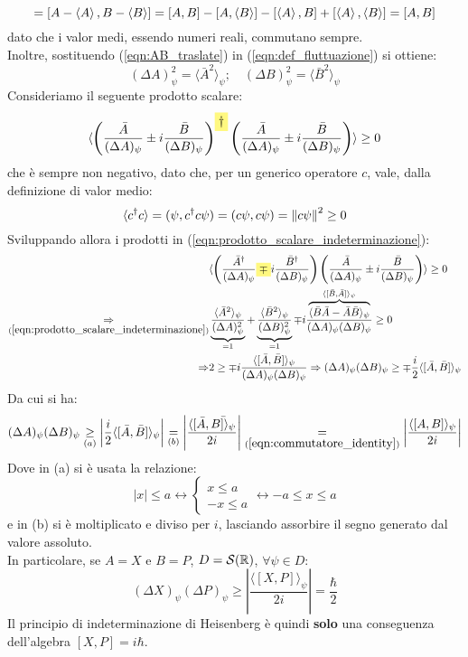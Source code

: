 \documentclass[../../FisicaTeorica.tex]{subfiles}
\begin{document}
\begin{equation}
[\bar{A},\bar{B}]=[A-\avg{A},B-\avg{B}]=[A,B]-[A,\avg{B}]-[\avg{A},B]+[\avg{A},\avg{B}]=[A,B]
\label{eqn:commutatore_identity}
\end{equation}
dato che i valor medi, essendo numeri reali, commutano sempre.\\
Inoltre, sostituendo (\ref{eqn:AB_traslate}) in (\ref{eqn:def_fluttuazione}) si ottiene:
\begin{equation}
(\Delta A)^2_\psi = \langle \bar{A}^2 \rangle_\psi; \quad (\Delta B)^2_\psi = \langle \bar{B}^2 \rangle_\psi
\label{eqn:prodotto_scalare_indeterminazione}
\end{equation}
Consideriamo il seguente prodotto scalare:
\[
\langle \left(\frac{\bar{A}}{(\Delta A)_\psi}\pm i \frac{\bar{B}}{(\Delta B)_\psi} \right)^{\hlc{Yellow}{\dag}} \left ( \frac{\bar{A}}{(\Delta A)_\psi}\pm i \frac{\bar{B}}{(\Delta B)_\psi }\right ) \rangle \geq 0
\]
che è sempre non negativo, dato che, per un generico operatore $c$, vale, dalla definizione di valor medio:
\[
\langle c^\dag c\rangle= (\psi,c^\dag c \psi)=( c\psi, c\psi ) =\left\lVert c\psi\right\rVert^2 \geq 0
\]
Sviluppando allora i prodotti in (\ref{eqn:prodotto_scalare_indeterminazione}):
\begin{align*}
&\langle \left( \frac{\bar{A}^\dag}{(\Delta A)_\psi}\hlc{Yellow}{\mp} i \frac{\bar{B}^\dag}{(\Delta B)_\psi}\right)\left(\frac{\bar{A}}{(\Delta A)_\psi} \pm i \frac{\bar{B}}{(\Delta B)_\psi}\right)\rangle \geq 0\\
\underset{(\ref{eqn:prodotto_scalare_indeterminazione})}{\Rightarrow} & \underbrace{\frac{\langle \bar{A}^2 \rangle_\psi}{(\Delta A)^2_\psi}}_{=1} +
\underbrace{\frac{\langle \bar{B}^2\rangle_\psi}{(\Delta B)^2_\psi}}_{=1} \mp i \frac{\overbrace{\langle \bar{B}\bar{A}-\bar{A}\bar{B}\rangle_\psi}^{\langle[\bar{B},\bar{A}]\rangle_\psi}}{(\Delta A)_\psi (\Delta B)_\psi}\geq 0\\
\Rightarrow &2 \geq\mp i\frac{\langle [\bar{A},\bar{B}]\rangle_\psi}{(\Delta A)_\psi (\Delta B)_\psi} \Rightarrow (\Delta A)_\psi(\Delta B)_\psi\geq\mp\frac{i}{2}\langle [\bar{A},\bar{B}]\rangle_\psi
\end{align*}
Da cui si ha:
\[
(\Delta A)_\psi(\Delta B)_\psi \underset{(a)}{\geq} \left|\frac{i}{2}\langle[\bar{A},\bar{B}]\rangle_\psi\right|\underset{(b)}{=}\left |\frac{\langle[\bar{A},\bar{B]\rangle_\psi}}{2i}\right|\underset{(\ref{eqn:commutatore_identity})}{=}
\left |\frac{\langle [A,B]\rangle_\psi}{2i} \right |
\]
Dove in (a) si è usata la relazione:
\[
|x|\leq a \leftrightarrow \begin{cases}
x \leq a\\
-x \leq a
\end{cases} \leftrightarrow -a \leq x \leq a
\]
e in (b) si è moltiplicato e diviso per $i$, lasciando assorbire il segno generato dal valore assoluto.\\
In particolare, se $A=X$ e $B=P$, $D=\mathcal{S}(\mathbb{R})$, $\forall \psi \in D$:
\[
(\Delta X)_\psi (\Delta P)_\psi \geq \left | 
\frac{\langle [X,P]\rangle_\psi}{2i}
\right | = \frac{\hbar}{2}
\]
Il principio di indeterminazione di Heisenberg è quindi \textbf{solo} una conseguenza dell'algebra $[X,P]=i\hbar$.
\end{document}
